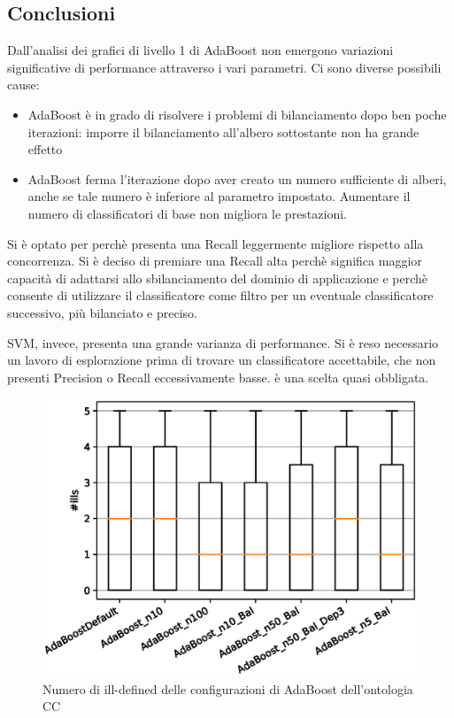 \documentclass[12pt,a4paper,oneside,hidelinks]{report}
\begin{document}
\subsection{Conclusioni}
Dall'analisi dei grafici di livello 1 di AdaBoost non emergono variazioni significative di performance attraverso i vari parametri. Ci sono diverse possibili cause:

\begin{itemize}
\item AdaBoost è in grado di risolvere i problemi di bilanciamento dopo ben poche iterazioni: imporre il bilanciamento all'albero sottostante non ha grande effetto
\item AdaBoost ferma l'iterazione dopo aver creato un numero sufficiente di alberi, anche se tale numero è inferiore al parametro impostato. Aumentare il numero di classificatori di base non migliora le prestazioni.
\end{itemize}

Si è optato per  perchè presenta una Recall leggermente migliore rispetto alla concorrenza. Si è deciso di premiare una Recall alta perchè significa maggior capacità di adattarsi allo sbilanciamento del dominio di applicazione e perchè consente di utilizzare il classificatore come filtro per un eventuale classificatore successivo, più bilanciato e preciso.

SVM, invece, presenta una grande varianza di performance. Si è reso necessario un lavoro di esplorazione prima di trovare un classificatore accettabile, che non presenti Precision o Recall eccessivamente basse.  è una scelta quasi obbligata.


\vspace*{\fill}

\begin{figure}[p]%
    \centering
    \includegraphics[scale = 0.80]{CC-AdaBoost-ills.eps}%
    \caption{Numero di ill-defined delle configurazioni di AdaBoost dell'ontologia CC}%
    \label{fig:ill1}%
\end{figure}
\end{document}
